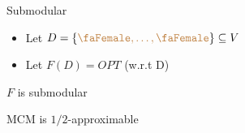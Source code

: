 \begin{frame}{Submodular}
\begin{itemize}[<+>]
  \item Let $D = \{{\color{brown}\text{\faFemale}, \ldots, \text{\faFemale}}\} \subseteq V$
  \item Let $F(D) = OPT$ (w.r.t D)
\end{itemize}

\onslide<+>
\begin{theorem}
$F$ is submodular
\end{theorem}

\onslide<+>
\begin{corollary}
MCM is $1/2$-approximable
\end{corollary}



\end{frame}